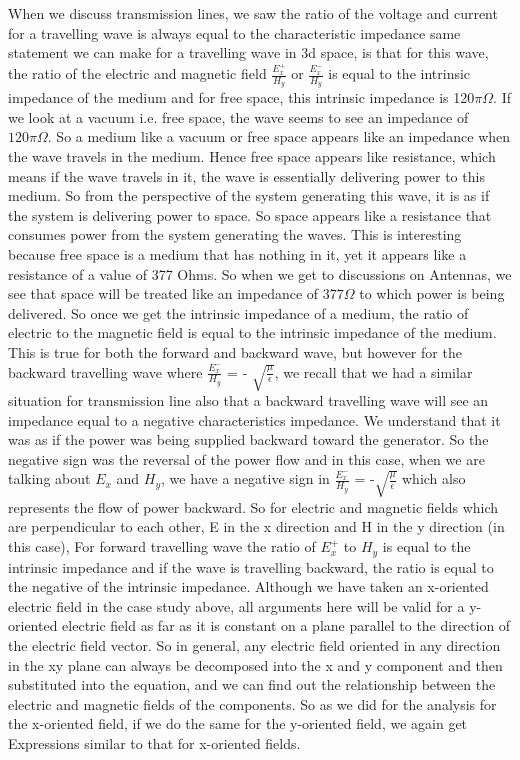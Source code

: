 When we discuss transmission lines, we saw the ratio of the voltage and current for a travelling wave is always equal to the characteristic impedance same statement we can make for a travelling wave in 3d space, is that for this wave, the ratio of the electric and magnetic field $\frac{E_x^{+}}{H_y}$ or $\frac{E_x^{-}}{H_y}$ is equal to the intrinsic impedance of the medium and for free space, this intrinsic impedance is 120$\pi\Omega$. If we look at a vacuum i.e. free space, the wave seems to see an impedance of $120\pi\Omega$. So a medium like a vacuum or free space appears like an impedance when the wave travels in the medium. Hence free space appears like resistance, which means if the wave travels in it, the wave is essentially delivering power to this medium. So from the perspective of the system generating this wave, it is as if the system is delivering power to space. So space appears like a resistance that consumes power from the system generating the waves. This is interesting because free space is a medium that has nothing in it, yet it appears like a resistance of a value of 377 Ohms. So when we get to discussions on Antennas, we see that space will be treated like an impedance of $377\Omega$ to which power is being delivered. So once we get the intrinsic impedance of a medium, the ratio of electric to the magnetic field is equal to the intrinsic impedance of the medium. This is true for both the forward and backward wave, but however for the backward travelling wave where $\frac{E_x^-}{H_y}$ = - $\sqrt{\frac{\mu}{\epsilon}}$, we recall that we had a similar situation for transmission line also that a backward travelling wave will see an impedance equal to a negative characteristics impedance. We understand that it was as if the power was being supplied backward toward the generator. So the negative sign was the reversal of the power flow and in this case, when we are talking about $E_x$ and $H_y$, we have a negative sign in $\frac{E_x^-}{H_y}$ = -$\sqrt{\frac{\mu}{\epsilon}}$ which also represents the flow of power backward. So for electric and magnetic fields which are perpendicular to each other, E in the x direction and H in the y direction (in this case), For forward travelling wave the ratio of $E_x^+$ to $H_y$ is equal to the intrinsic impedance and if the wave is travelling backward, the ratio is equal to the negative of the intrinsic impedance.
Although we have taken an x-oriented electric field in the case study above, all arguments here will be valid for a y-oriented electric field as far as it is constant on a plane parallel to the direction of the electric field vector. So in general, any electric field oriented in any direction in the xy plane can always be decomposed into the x and y component and then substituted into the equation, and we can find out the relationship between the electric and magnetic fields of the components. So as we did for the analysis for the x-oriented field, if we do the same for the y-oriented field, we again get Expressions similar to that for x-oriented fields.

